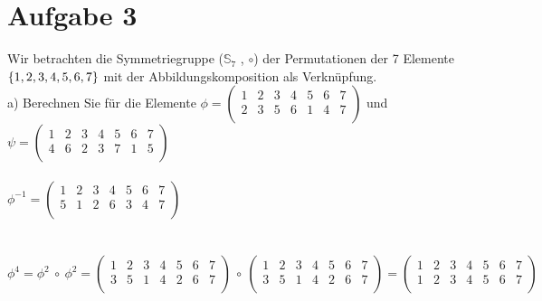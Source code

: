 \section*{Aufgabe 3}

Wir betrachten die Symmetriegruppe ($\mathbb{S}_7$ , $\circ$) der Permutationen der 7 Elemente $\{1, 2, 3, 4,\\ 5, 6, 7\}$ mit der Abbildungskomposition als Verknüpfung.\\

a) Berechnen Sie für die Elemente
$\phi =
\begin{pmatrix}
1 & 2 & 3 & 4 & 5 & 6 & 7\\
2 & 3 & 5 & 6 & 1 & 4 & 7\\
\end{pmatrix}$ und
$\psi = 
\begin{pmatrix}
1 & 2 & 3 & 4 & 5 & 6 & 7\\
4 & 6 & 2 & 3 & 7 & 1 & 5\\
\end{pmatrix}$\\~\\

$\phi^{-1} =
\begin{pmatrix}
1 & 2 & 3 & 4 & 5 & 6 & 7\\
5 & 1 & 2 & 6 & 3 & 4 & 7\\
\end{pmatrix}$\\~\\~\\

$\phi^{4} = \phi^{2} \ \circ \ \phi^{2} =
\begin{pmatrix}
1 & 2 & 3 & 4 & 5 & 6 & 7\\
3 & 5 & 1 & 4 & 2 & 6 & 7\\
\end{pmatrix} \ \circ \
\begin{pmatrix}
1 & 2 & 3 & 4 & 5 & 6 & 7\\
3 & 5 & 1 & 4 & 2 & 6 & 7\\
\end{pmatrix} =
\begin{pmatrix}
1 & 2 & 3 & 4 & 5 & 6 & 7\\
1 & 2 & 3 & 4 & 5 & 6 & 7\\
\end{pmatrix}$\\~\\~\\

